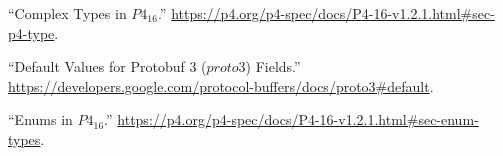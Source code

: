 \documentclass[11pt]{article}
\begin{document}
{{\begin{thebibliography}{45}
\mdbibitemlabel{{}[5]}\textquotedblleft{}Complex Types in $P4_{16}$.\textquotedblright{} \href{https://p4.org/p4-spec/docs/P4-16-v1.2.1.html\%23sec-p4-type}{{\ttfamily https://\hspace{0pt}p4.\hspace{0pt}org/\hspace{0pt}p4-\hspace{0pt}spec/\hspace{0pt}docs/\hspace{0pt}P4-\hspace{0pt}16-\hspace{0pt}v1.\hspace{0pt}2.\hspace{0pt}1.\hspace{0pt}html\#\hspace{0pt}sec-\hspace{0pt}p4-\hspace{0pt}type}}.\label{p4complextypes}%

\mdbibitemlabel{{}[6]}\textquotedblleft{}Default Values for Protobuf 3 ($proto3$) Fields.\textquotedblright{} \href{https://developers.google.com/protocol-buffers/docs/proto3\%23default}{{\ttfamily https://\hspace{0pt}developers.\hspace{0pt}google.\hspace{0pt}com/\hspace{0pt}protocol-\hspace{0pt}buffers/\hspace{0pt}docs/\hspace{0pt}proto3\#\hspace{0pt}default}}.\label{protodefaults}%

\mdbibitemlabel{{}[7]}\textquotedblleft{}Enums in $P4_{16}$.\textquotedblright{} \href{https://p4.org/p4-spec/docs/P4-16-v1.2.1.html\%23sec-enum-types}{{\ttfamily https://\hspace{0pt}p4.\hspace{0pt}org/\hspace{0pt}p4-\hspace{0pt}spec/\hspace{0pt}docs/\hspace{0pt}P4-\hspace{0pt}16-\hspace{0pt}v1.\hspace{0pt}2.\hspace{0pt}1.\hspace{0pt}html\#\hspace{0pt}sec-\hspace{0pt}enum-\hspace{0pt}types}}.\label{p4enums}%


\end{thebibliography}}}
\end{document}
